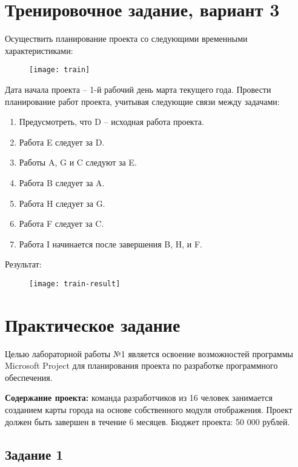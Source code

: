 
\section*{Тренировочное задание, вариант 3}

Осуществить планирование проекта со следующими временными характеристиками:

\begin{figure}[h!]
	\texttt{[image: train]}
\end{figure}

Дата начала проекта – 1-й рабочий день марта текущего года.
Провести планирование работ проекта, учитывая следующие связи между задачами:

\begin{enumerate}
	\item Предусмотреть, что D – исходная работа проекта.
	\item Работа E следует за D.
	\item Работы A, G и C следуют за E.
	\item Работа B следует за A.
	\item Работа H следует за G.
	\item Работа F следует за C.
	\item Работа I начинается после завершения B, H, и F.
\end{enumerate}

Результат: 

\begin{figure}[h!]
	\texttt{[image: train-result]}
\end{figure}

\section*{Практическое задание}

Целью лабораторной работы №1 является освоение возможностей программы Microsoft Project для планирования проекта по разработке программного обеспечения.

\textbf{Содержание проекта:} команда разработчиков из 16 человек занимается созданием карты города на основе собственного модуля отображения. Проект должен быть завершен в течение 6 месяцев. Бюджет проекта: 50 000 рублей.


\subsection*{Задание 1}

